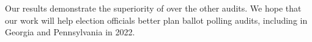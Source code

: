 Our results demonstrate the superiority of \Providence over the other audits. We hope that our work will help election officials better plan ballot polling audits, including in Georgia and Pennsylvania in 2022. 


